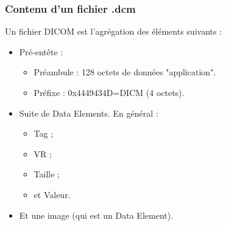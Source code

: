 \frame
{
	\frametitle{Contenu d'un fichier .dcm}
	
	Un fichier DICOM est l'agr\'egation des \'el\'ements suivants :
	\begin{itemize}
		\item<2-> Pr\'e-ent\^ete :
		\begin{itemize}
			\item<3-> Pr\'eambule : 128 octets de donn\'ees "application".
			\item<4-> Pr\'efixe : 0x4449434D=DICM (4 octets).
		\end{itemize}
		\item<5-> Suite de Data Elements.
		En g\'en\'eral :
		\begin{itemize}
			\item<6-> Tag ;
			\item<7-> VR ;
			\item<8-> Taille ;
			\item<9-> et Valeur.
		\end{itemize}
		\item<10-> Et une image (qui est un Data Element).
	\end{itemize}
}


